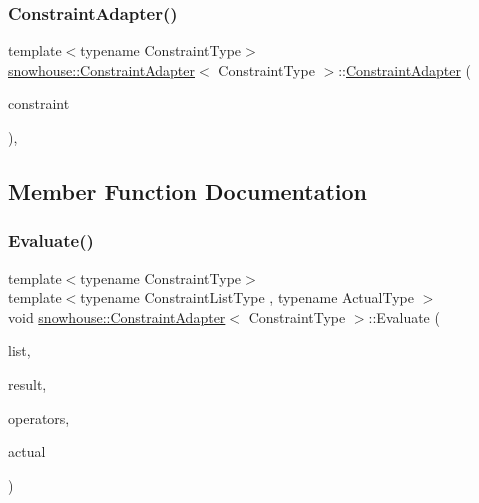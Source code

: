 \subsubsection{\texorpdfstring{ConstraintAdapter()}{ConstraintAdapter()}}
{\footnotesize\ttfamily template$<$typename Constraint\+Type$>$ \\
\mbox{\hyperlink{structsnowhouse_1_1ConstraintAdapter}{snowhouse\+::\+Constraint\+Adapter}}$<$ Constraint\+Type $>$\+::\mbox{\hyperlink{structsnowhouse_1_1ConstraintAdapter}{Constraint\+Adapter}} (\begin{DoxyParamCaption}\item[{const Constraint\+Type \&}]{constraint }\end{DoxyParamCaption})\hspace{0.3cm}{\ttfamily [inline]}, {\ttfamily [explicit]}}



\subsection{Member Function Documentation}
\mbox{\label{structsnowhouse_1_1ConstraintAdapter_a42a6d2b5c783e174f8636440964be9f7}} 
\subsubsection{\texorpdfstring{Evaluate()}{Evaluate()}}
{\footnotesize\ttfamily template$<$typename Constraint\+Type$>$ \\
template$<$typename Constraint\+List\+Type , typename Actual\+Type $>$ \\
void \mbox{\hyperlink{structsnowhouse_1_1ConstraintAdapter}{snowhouse\+::\+Constraint\+Adapter}}$<$ Constraint\+Type $>$\+::Evaluate (\begin{DoxyParamCaption}\item[{Constraint\+List\+Type \&}]{list,  }\item[{\mbox{\hyperlink{namespacesnowhouse_a719169b1315a13161c15f25e600a8f51}{Result\+Stack}} \&}]{result,  }\item[{\mbox{\hyperlink{namespacesnowhouse_adcb10e215e6a4bbcb35722a9c7270fc6}{Operator\+Stack}} \&}]{operators,  }\item[{const Actual\+Type \&}]{actual }\end{DoxyParamCaption})\hspace{0.3cm}{\ttfamily [inline]}}



